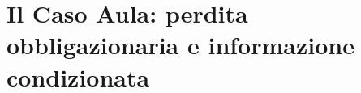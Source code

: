 \documentclass[handout]{beamer}%
\providecommand{\1}{\mathbf{1}}
\begin{document}













\section{Il Caso Aula: perdita obbligazionaria e informazione condizionata}

\end{document}
